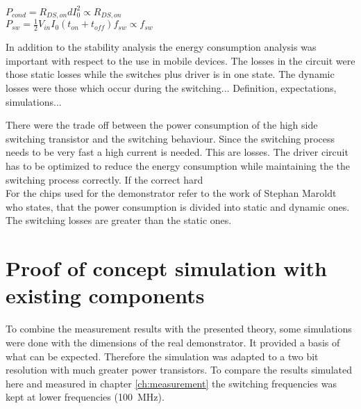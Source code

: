 $ P_{cond} = R_{DS,on}dI_0^2 \propto R_{DS,on} $ \\
$ P_{sw} = \frac{1}{2} V_{in}I_0(t_{on}+t_{off})f_{sw} \propto f_{sw} $ 

In addition to the stability analysis the energy consumption analysis was important with respect to the use in mobile devices.
The losses in the circuit were those static losses while the switches plus driver is in one state.
The dynamic losses were those which occur during the switching...
Definition, expectations, simulations...

There were the trade off between the power consumption of the high side switching transistor and the switching behaviour.
Since the switching process needs to be very fast a high current is needed.
This are losses.
The driver circuit has to be optimized to reduce the energy consumption while maintaining the the switching process correctly.
If the correct hard 
\\
 For the chips used for the demonstrator refer to the work of Stephan Maroldt who states, that the power consumption is divided into static and dynamic ones. The switching losses are greater than the static ones.

\section{Proof of concept simulation with existing components}
\label{ch:ProofOfConceptWithExistingComponents}
To combine the measurement results with the presented theory, some simulations were done with the dimensions of the real demonstrator.
It provided a basis of what can be expected.
Therefore the simulation was adapted to a two bit resolution with much greater power transistors.
To compare the results simulated here and measured in chapter \ref{ch:measurement} the switching frequencies was kept at lower frequencies (\SI{100}{\mega \hertz}).

